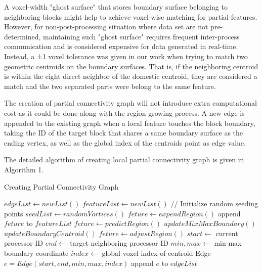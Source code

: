 \documentclass[10pt, conference, compsocconf]{IEEEtran}
\begin{document}
A voxel-width "ghost surface" that stores boundary surface belonging to neighboring blocks might help to achieve voxel-wise matching for partial features. However, for non-post-processing situation where data set are not pre-determined, maintaining such "ghost surface" requires frequent inter-process communication and is considered expensive for data generated in real-time. Instead, a ±1 voxel tolerance was given in our work when trying to match two geometric centroids on the boundary surfaces. That is, if the neighboring centroid is within the eight direct neighbor of the domestic centroid, they are considered a match and the two separated parts were belong to the same feature.

The creation of partial connectivity graph will not introduce extra computational cost as it could be done along with the region growing process. A new edge is appended to the existing graph when a local feature touches the block boundary, taking the ID of the target block that shares a same boundary surface as the ending vertex, as well as the global index of the centroids point as edge value.

The detailed algorithm of creating local partial connectivity graph is given in Algorithm 1.
\begin{algorithm}
\caption{Creating Partial Connectivity Graph}
\begin{algorithmic}[1]
\STATE $edgeList \leftarrow new List()$
\STATE $featureList \leftarrow new List()$
	\STATE // Initialize random seeding points
	\STATE $seedList \leftarrow randomVortices()$
		\STATE $feture \leftarrow expendRegion()$
		\STATE append $feture$ to $featureList$
	\ENDFOR	
\ELSE
		\STATE $feture \leftarrow predictRegion()$
				\STATE $updateMixMaxBoundary()$
				\STATE $updateBoundaryCentroid()$
			\ENDIF
		\STATE $feture \leftarrow adjustRegion()$	
		\ENDWHILE
		\STATE $start \leftarrow$ current processor ID
		\STATE $end \leftarrow$ target neighboring processor ID
		\STATE $min,max \leftarrow$ min-max boundary coordinate
		\STATE $index \leftarrow$ global voxel index of centroid
		\STATE Edge $e = Edge(start, end, min, max, index)$
		\STATE append $e$ to $edgeList$
	\ENDFOR
\ENDIF
\end{algorithmic}
\end{algorithm}
\end{document}

